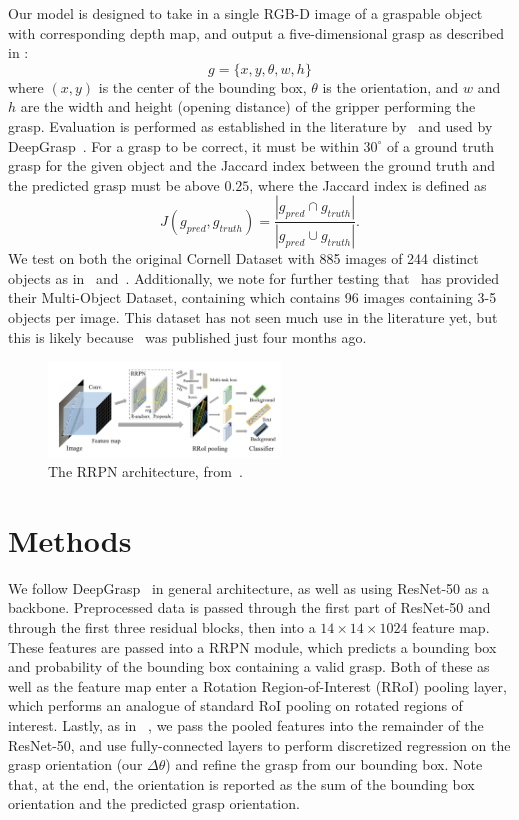 \documentclass[10pt,twocolumn,letterpaper]{article}
\begin{document}
Our model is designed to take in a single RGB-D image of a graspable object with corresponding depth map, and output a five-dimensional grasp as described in \cite{vela2018}:
$$g = \{x, y, \theta, w, h\}$$ 
where $(x, y)$ is the center of the bounding box, $\theta$ is the orientation, and $w$ and $h$ are the width and height (opening distance) of the gripper performing the grasp. Evaluation is performed as established in the literature by~\cite{redmon14} and used by DeepGrasp~\cite{vela2018}. For a grasp to be correct, it must be within $30^\circ$ of a ground truth grasp for the given object and the Jaccard index between the ground truth and the predicted grasp must be above $0.25$, where the Jaccard index is defined as
$$J(g_{pred}, g_{truth}) = \frac{|g_{pred} \cap g_{truth}|}{|g_{pred} \cup g_{truth}|}.$$
We test on both the original Cornell Dataset with 885 images of 244 distinct objects as in~\cite{redmon14} and~\cite{vela2018}. Additionally, we note for further testing that~\cite{vela2018} has provided their Multi-Object Dataset, containing which contains 96 images containing 3-5 objects per image. This dataset has not seen much use in the literature yet, but this is likely because~\cite{vela2018} was published just four months ago.

\begin{figure}
    \centering
    \hspace*{-0.8cm}\includegraphics[width=0.55\textwidth]{latex/rrpn.png}
    \caption{The RRPN architecture, from~\cite{ma18}.}
    \label{fig:rrpn}
\end{figure}

\section{Methods}

We follow DeepGrasp~\cite{vela2018} in general architecture, as well as using ResNet-50 as a backbone. Preprocessed data is passed through the first part of ResNet-50 and through the first three residual blocks, then into a $14 \times 14 \times 1024$ feature map. These features are passed into a RRPN module, which predicts a bounding box and probability of the bounding box containing a valid grasp. Both of these as well as the feature map enter a Rotation Region-of-Interest (RRoI) pooling layer, which performs an analogue of standard RoI pooling on rotated regions of interest. Lastly, as in ~\cite{vela2018}, we pass the pooled features into the remainder of the ResNet-50, and use fully-connected layers to perform discretized regression on the grasp orientation (our $\Delta \theta$) and refine the grasp from our bounding box. Note that, at the end, the orientation is reported as the sum of the bounding box orientation and the predicted grasp orientation. 
\end{document}
